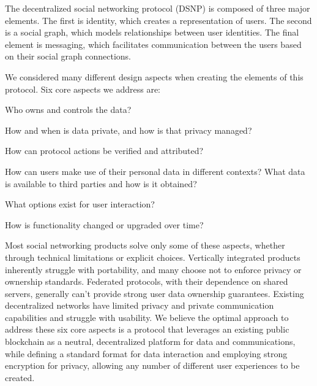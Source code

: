 \documentclass[12pt,letterpaper]{article}
\providecommand{\tightlist}{%
\setlength{\itemsep}{0pt}\setlength{\parskip}{0pt}}
\begin{document}
The decentralized social networking protocol (DSNP) is composed of three major elements.
The first is identity, which creates a representation of users. The second is a social
graph, which models relationships between user identities. The final element is messaging,
which facilitates communication between the users based on their social graph connections.

\begin{samepage}
	We considered many different design aspects when creating the elements of
	this protocol. Six core aspects we address are:

	\begin{description}
		\tightlist
		\item[Ownership:]
		      Who owns and controls the data?
		\item[Privacy:]
		      How and when is data private, and how is that privacy managed?
		\item[Authenticity:]
		      How can protocol actions be verified and attributed?
		\item[Portability:]
		      How can users make use of their personal data in different contexts?
		      What data is available to third parties and how is it obtained?
		\item[Usability:]
		      What options exist for user interaction?
		\item[Extensibility:]
		      How is functionality changed or upgraded over time?
	\end{description}
\end{samepage}

Most social networking products solve only some of these aspects, whether through technical
limitations or explicit choices. Vertically integrated products inherently struggle with
portability, and many choose not to enforce privacy or ownership standards. Federated
protocols, with their dependence on shared servers, generally can't provide strong user
data ownership guarantees. Existing decentralized networks have limited privacy and
private communication capabilities and struggle with usability. We believe the optimal
approach to address these six core aspects is a protocol that leverages an existing public
blockchain as a neutral, decentralized platform for data and communications, while
defining a standard format for data interaction and employing strong encryption for
privacy, allowing any number of different user experiences to be created.
\end{document}
